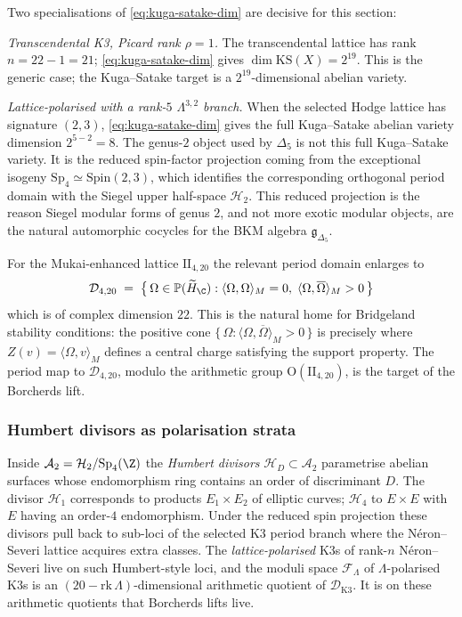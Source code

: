 Two specialisations of \eqref{eq:kuga-satake-dim} are decisive for this section:

\emph{Transcendental K3, Picard rank $\rho = 1$.} The transcendental lattice has rank $n = 22 - 1 = 21$; \eqref{eq:kuga-satake-dim} gives $\dim \mathrm{KS}(X) = 2^{19}$. This is the generic case; the Kuga--Satake target is a $2^{19}$-dimensional abelian variety.

\emph{Lattice-polarised with a rank-\(5\) \(\Lambda^{3,2}\) branch.} When the selected Hodge lattice has signature \((2,3)\), \eqref{eq:kuga-satake-dim} gives the full Kuga--Satake abelian variety dimension \(2^{5-2}=8\). The genus-\(2\) object used by \(\Delta_5\) is not this full Kuga--Satake variety. It is the reduced spin-factor projection coming from the exceptional isogeny \(\mathrm{Sp}_4\simeq\mathrm{Spin}(2,3)\), which identifies the corresponding orthogonal period domain with the Siegel upper half-space \(\mathcal H_2\). This reduced projection is the reason Siegel modular forms of genus \(2\), and not more exotic modular objects, are the natural automorphic cocycles for the BKM algebra \(\mathfrak g_{\Delta_5}\).

For the Mukai-enhanced lattice $\mathrm{II}_{4, 20}$ the relevant period domain enlarges to
\[
 \mathcal D_{4, 20} \;=\; \bigl\{\, \Omega \in \mathbb P(\widetilde H_\C) : \langle \Omega, \Omega\rangle_M = 0, \; \langle \Omega, \overline\Omega\rangle_M > 0 \,\bigr\}
\]
which is of complex dimension $22$. This is the natural home for Bridgeland stability conditions: the positive cone $\{\,\Omega : \langle \Omega, \overline\Omega\rangle_M > 0\,\}$ is precisely where $Z(v) = \langle \Omega, v\rangle_M$ defines a central charge satisfying the support property. The period map to $\mathcal D_{4, 20}$, modulo the arithmetic group $\mathrm{O}(\mathrm{II}_{4, 20})$, is the target of the Borcherds lift.

\subsubsection{Humbert divisors as polarisation strata}

Inside $\mathcal A_2 = \mathcal H_2 / \mathrm{Sp}_4(\Z)$ the \emph{Humbert divisors} $\mathcal H_D \subset \mathcal A_2$ parametrise abelian surfaces whose endomorphism ring contains an order of discriminant $D$. The divisor $\mathcal H_1$ corresponds to products $E_1 \times E_2$ of elliptic curves; $\mathcal H_4$ to $E \times E$ with $E$ having an order-$4$ endomorphism. Under the reduced spin projection these divisors pull back to sub-loci of the selected K3 period branch where the N\'eron--Severi lattice acquires extra classes. The \emph{lattice-polarised} K3s of rank-$n$ N\'eron--Severi live on such Humbert-style loci, and the moduli space $\mathcal F_\Lambda$ of $\Lambda$-polarised K3s is an $(20 - \mathrm{rk}\, \Lambda)$-dimensional arithmetic quotient of $\mathcal D_{\mathrm{K3}}$. It is on these arithmetic quotients that Borcherds lifts live.

